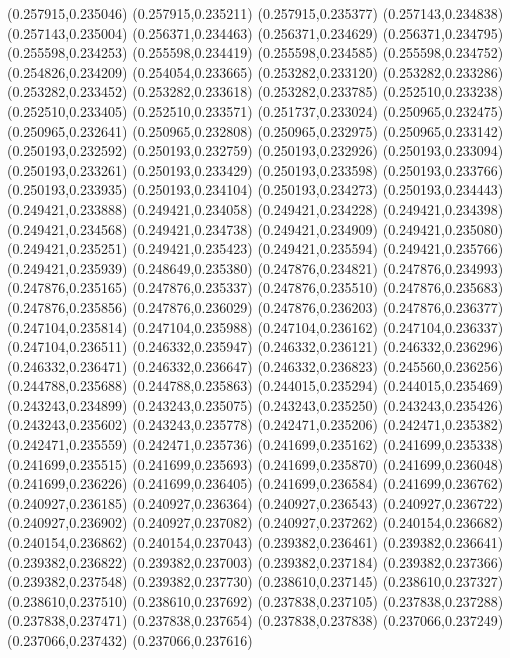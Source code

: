 (0.257915,0.235046)
(0.257915,0.235211)
(0.257915,0.235377)
(0.257143,0.234838)
(0.257143,0.235004)
(0.256371,0.234463)
(0.256371,0.234629)
(0.256371,0.234795)
(0.255598,0.234253)
(0.255598,0.234419)
(0.255598,0.234585)
(0.255598,0.234752)
(0.254826,0.234209)
(0.254054,0.233665)
(0.253282,0.233120)
(0.253282,0.233286)
(0.253282,0.233452)
(0.253282,0.233618)
(0.253282,0.233785)
(0.252510,0.233238)
(0.252510,0.233405)
(0.252510,0.233571)
(0.251737,0.233024)
(0.250965,0.232475)
(0.250965,0.232641)
(0.250965,0.232808)
(0.250965,0.232975)
(0.250965,0.233142)
(0.250193,0.232592)
(0.250193,0.232759)
(0.250193,0.232926)
(0.250193,0.233094)
(0.250193,0.233261)
(0.250193,0.233429)
(0.250193,0.233598)
(0.250193,0.233766)
(0.250193,0.233935)
(0.250193,0.234104)
(0.250193,0.234273)
(0.250193,0.234443)
(0.249421,0.233888)
(0.249421,0.234058)
(0.249421,0.234228)
(0.249421,0.234398)
(0.249421,0.234568)
(0.249421,0.234738)
(0.249421,0.234909)
(0.249421,0.235080)
(0.249421,0.235251)
(0.249421,0.235423)
(0.249421,0.235594)
(0.249421,0.235766)
(0.249421,0.235939)
(0.248649,0.235380)
(0.247876,0.234821)
(0.247876,0.234993)
(0.247876,0.235165)
(0.247876,0.235337)
(0.247876,0.235510)
(0.247876,0.235683)
(0.247876,0.235856)
(0.247876,0.236029)
(0.247876,0.236203)
(0.247876,0.236377)
(0.247104,0.235814)
(0.247104,0.235988)
(0.247104,0.236162)
(0.247104,0.236337)
(0.247104,0.236511)
(0.246332,0.235947)
(0.246332,0.236121)
(0.246332,0.236296)
(0.246332,0.236471)
(0.246332,0.236647)
(0.246332,0.236823)
(0.245560,0.236256)
(0.244788,0.235688)
(0.244788,0.235863)
(0.244015,0.235294)
(0.244015,0.235469)
(0.243243,0.234899)
(0.243243,0.235075)
(0.243243,0.235250)
(0.243243,0.235426)
(0.243243,0.235602)
(0.243243,0.235778)
(0.242471,0.235206)
(0.242471,0.235382)
(0.242471,0.235559)
(0.242471,0.235736)
(0.241699,0.235162)
(0.241699,0.235338)
(0.241699,0.235515)
(0.241699,0.235693)
(0.241699,0.235870)
(0.241699,0.236048)
(0.241699,0.236226)
(0.241699,0.236405)
(0.241699,0.236584)
(0.241699,0.236762)
(0.240927,0.236185)
(0.240927,0.236364)
(0.240927,0.236543)
(0.240927,0.236722)
(0.240927,0.236902)
(0.240927,0.237082)
(0.240927,0.237262)
(0.240154,0.236682)
(0.240154,0.236862)
(0.240154,0.237043)
(0.239382,0.236461)
(0.239382,0.236641)
(0.239382,0.236822)
(0.239382,0.237003)
(0.239382,0.237184)
(0.239382,0.237366)
(0.239382,0.237548)
(0.239382,0.237730)
(0.238610,0.237145)
(0.238610,0.237327)
(0.238610,0.237510)
(0.238610,0.237692)
(0.237838,0.237105)
(0.237838,0.237288)
(0.237838,0.237471)
(0.237838,0.237654)
(0.237838,0.237838)
(0.237066,0.237249)
(0.237066,0.237432)
(0.237066,0.237616)
